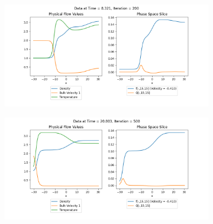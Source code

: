 \documentclass{article}
\begin{document}
\begin{figure}[H]
  \begin{subfigure}[b]{\textwidth}
    \includegraphics[width=\textwidth]{imgs/ts_output2/plots/plot200.png}
  \end{subfigure}
  \hfill
  \begin{subfigure}[b]{\textwidth}
    \includegraphics[width=\textwidth]{imgs/ts_output2/plots/plot500.png}
    \end{subfigure}
\end{figure}
\end{document}
